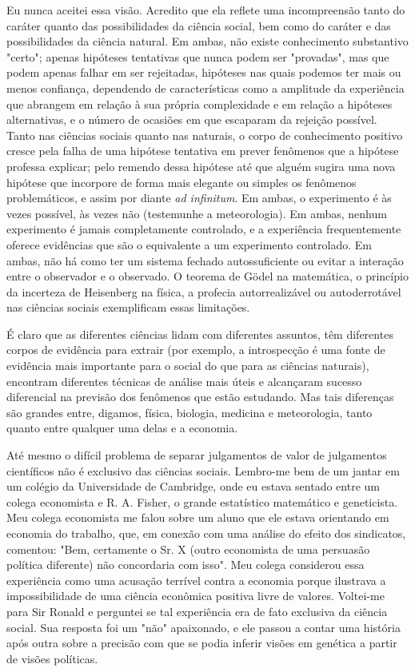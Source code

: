 \documentclass[12pt]{article}
\begin{document}
Eu nunca aceitei essa visão. Acredito que ela reflete uma incompreensão tanto do caráter quanto das possibilidades da ciência social, bem como do caráter e das possibilidades da ciência natural. Em ambas, não existe conhecimento substantivo "certo"; apenas hipóteses tentativas que nunca podem ser "provadas", mas que podem apenas falhar em ser rejeitadas, hipóteses nas quais podemos ter mais ou menos confiança, dependendo de características como a amplitude da experiência que abrangem em relação à sua própria complexidade e em relação a hipóteses alternativas, e o número de ocasiões em que escaparam da rejeição possível. Tanto nas ciências sociais quanto nas naturais, o corpo de conhecimento positivo cresce pela falha de uma hipótese tentativa em prever fenômenos que a hipótese professa explicar; pelo remendo dessa hipótese até que alguém sugira uma nova hipótese que incorpore de forma mais elegante ou simples os fenômenos problemáticos, e assim por diante \textit{ad infinitum}. Em ambas, o experimento é às vezes possível, às vezes não (testemunhe a meteorologia). Em ambas, nenhum experimento é jamais completamente controlado, e a experiência frequentemente oferece evidências que são o equivalente a um experimento controlado. Em ambas, não há como ter um sistema fechado autossuficiente ou evitar a interação entre o observador e o observado. O teorema de Gödel na matemática, o princípio da incerteza de Heisenberg na física, a profecia autorrealizável ou autoderrotável nas ciências sociais exemplificam essas limitações.

É claro que as diferentes ciências lidam com diferentes assuntos, têm diferentes corpos de evidência para extrair (por exemplo, a introspecção é uma fonte de evidência mais importante para o social do que para as ciências naturais), encontram diferentes técnicas de análise mais úteis e alcançaram sucesso diferencial na previsão dos fenômenos que estão estudando. Mas tais diferenças são grandes entre, digamos, física, biologia, medicina e meteorologia, tanto quanto entre qualquer uma delas e a economia.

Até mesmo o difícil problema de separar julgamentos de valor de julgamentos científicos não é exclusivo das ciências sociais. Lembro-me bem de um jantar em um colégio da Universidade de Cambridge, onde eu estava sentado entre um colega economista e R. A. Fisher, o grande estatístico matemático e geneticista. Meu colega economista me falou sobre um aluno que ele estava orientando em economia do trabalho, que, em conexão com uma análise do efeito dos sindicatos, comentou: "Bem, certamente o Sr. X (outro economista de uma persuasão política diferente) não concordaria com isso". Meu colega considerou essa experiência como uma acusação terrível contra a economia porque ilustrava a impossibilidade de uma ciência econômica positiva livre de valores. Voltei-me para Sir Ronald e perguntei se tal experiência era de fato exclusiva da ciência social. Sua resposta foi um "não" apaixonado, e ele passou a contar uma história após outra sobre a precisão com que se podia inferir visões em genética a partir de visões políticas.
\end{document}
